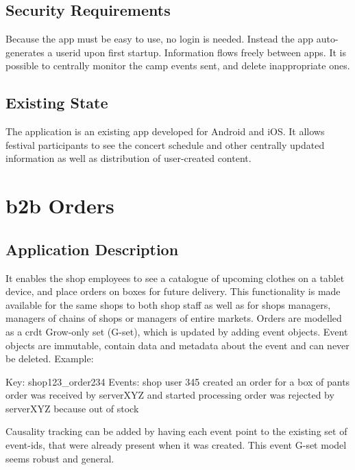 \documentclass[11pt,a4paper]{report}
\begin{document}
\subsection{Security Requirements}
Because the app must be easy to use, no login is needed. Instead the app auto-generates a userid upon first startup.
Information flows freely between apps.
It is possible to centrally monitor the camp events sent, and delete inappropriate ones.

\subsection{Existing State}
The application is an existing app developed for Android and iOS. It allows festival participants to see the concert schedule and other centrally updated information as well as distribution of user-created content.


\section{\gls{b2b} Orders}
\subsection{Application Description}
It enables the shop employees to see a catalogue of upcoming clothes on a tablet device, and place orders on boxes for future delivery. This functionality is made available for the same shops to both shop staff as well as for shops managers, managers of chains of shops or managers of entire markets.
Orders are modelled as a \gls{crdt} Grow-only set (G-set), which is updated by adding event objects. Event objects are immutable, contain data and metadata about the event and can never be deleted. Example:

Key: shop123\_order234
Events:
shop user 345 created an order for a box of pants
order was received by serverXYZ and started processing
order was rejected by serverXYZ because out of stock

Causality tracking can be added by having each event point to the existing set of event-ids, that were already present when it was created. This event G-set model seems robust and general.
\end{document}
